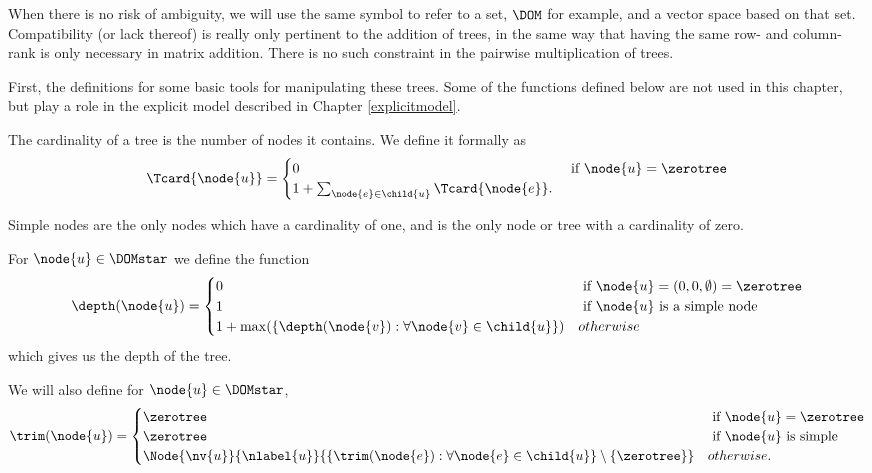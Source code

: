 When there is no risk of ambiguity, we will use the same symbol to
refer to a set, $\DOM$ for example, and a vector space based on that
set. Compatibility (or lack thereof) is really only pertinent to the
addition of trees, in the same way that having the same row- and
column-rank is only necessary in matrix addition.  There is no such
constraint in the pairwise multiplication of trees.


First, the definitions for some basic tools for manipulating these
trees. Some of the functions defined below are not used in this chapter, but
play a role in the explicit model described in Chapter \ref{explicitmodel}.

\begin{definition}
  The cardinality of a tree is the number of nodes it contains. We
  define it formally as
  \begin{align*}
  \Tcard{\node{u}} = \begin{cases}
    0 & \text{ if } \node{u} = \zerotree\\
    1 + \sum_{\node{e}\in\child{u}} \Tcard{\node{e}}.
    \end{cases}
  \end{align*}

Simple nodes are the only nodes which have a cardinality of one, and \tzerotree is the only node or tree with a
cardinality of zero.
\end{definition}

\begin{definition}
  For \(\node{u} \in \DOMstar\) we define the function
  \begin{align*}
    \depth(\node{u}) = \begin{cases}
      0 & \text{ if } \node{u} = (0,0,\emptyset) = \zerotree \\
      1 & \text{ if } \node{u} \text{ is a simple node} \\
      1 + \max(\lbrace\depth(\node{v}):\forall \node{v} \in \child{u}\rbrace) & otherwise
    \end{cases}
  \end{align*}
  which gives us the depth of the tree.
\end{definition}

\begin{definition}
  We will also define for \(\node{u} \in \DOMstar\),
  \begin{align*}
      \trim(\node{u}) = \begin{cases}
        \zerotree & \text{ if } \node{u} = \zerotree \\
        \zerotree & \text{ if } \node{u} \text{ is simple} \\
        \Node{\nv{u}}{\nlabel{u}}{\lbrace \trim(\node{e}): \forall\node{e}\in\child{u} \rbrace \setminus \{\zerotree\}} & otherwise.
      \end{cases}
  \end{align*}
\end{definition}

